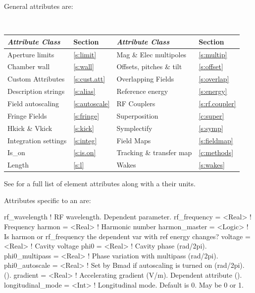 {General  attributes are:
\begin{center}
\tt
\begin{tabular}{llll} \toprule
  {\sl Attribute Class}      & Section            & {\sl Attribute Class}      & Section            \\ \midrule
  Aperture limits            & \ref{s:limit}      & Mag \& Elec multipoles     & \ref{s:multip}     \\
  Chamber wall               & \ref{s:wall}       & Offsets, pitches \& tilt   & \ref{s:offset}     \\
  Custom Attributes          & \ref{s:cust.att}   & Overlapping Fields         & \ref{s:overlap}    \\ 
  Description strings        & \ref{s:alias}      & Reference energy           & \ref{s:energy}     \\
  Field autoscaling          & \ref{s:autoscale}  & RF Couplers                & \ref{s:rf.coupler} \\
  Fringe Fields              & \ref{s:fringe}     & Superposition              & \ref{c:super}      \\
  Hkick \& Vkick             & \ref{s:kick}       & Symplectify                & \ref{s:symp}       \\
  Integration settings       & \ref{s:integ}      & Field Maps                 & \ref{s:fieldmap}   \\
  Is_on                      & \ref{s:is.on}      & Tracking \& transfer map   & \ref{c:methods}    \\
  Length                     & \ref{s:l}          & Wakes                      & \ref{s:wakes}      \\
  \bottomrule
\end{tabular}
\end{center}
\toffset
See  for a full list of element attributes along with a their units.

Attributes specific to an  are:
\begin{example}
  rf_wavelength               ! RF wavelength. Dependent parameter.
  rf_frequency    = <Real>    ! Frequency
  harmon          = <Real>    ! Harmonic number
  harmon_master   = <Logic>   ! Is harmon or rf_frequency the dependent var with ref energy changes?
  voltage         = <Real>    ! Cavity voltage
  phi0            = <Real>    ! Cavity phase (rad/2pi).
  phi0_multipass  = <Real>    ! Phase variation with multipass (rad/2pi).
  phi0_autoscale  = <Real>    ! Set by Bmad if autoscaling is turned on (rad/2pi). ().
  gradient        = <Real>    ! Accelerating gradient (V/m). Dependent attribute ().
  longitudinal_mode = <Int>   ! Longitudinal mode. Default is 0. May be 0 or 1.
\end{example}

}
